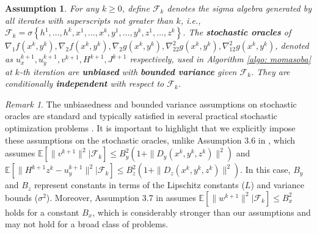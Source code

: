 \documentclass[10pt]{article}
\newtheorem{assumption}{Assumption}
\theoremstyle{remark}
\newtheorem*{remark}{Remark}
\def\setF{\mathscr{F}} %
\newcommand{\E}{\mathbb{E}}
\newcommand{\norm}[1]{\left\|#1\right\|}
\begin{document}
\begin{assumption}\label{aspt: stochastic_grad}
    For any $k\geq 0$, define $\setF_k$ denotes the sigma algebra generated by all iterates with superscripts not greater than $k$, i.e., $\setF_k = \sigma\left\{h^1, \dots, h^k, x^1,\dots, x^k, y^1, \dots, y^k, z^1,\dots,z^k\right\}$.
    The \textbf{stochastic oracles} of $\nabla_1 f(x^k, y^k), \nabla_2 f(x^k, y^k), \nabla_2 g(x^k, y^k), \nabla_{22}^2 g(x^k, y^k), \nabla_{12}^2 g(x^k, y^k)$, denoted as $u_x^{k+1}, u_y^{k+1}, v^{k+1}, H^{k+1}, J^{k+1}$ respectively, used in Algorithm \ref{algo: momasoba} at $k$-th iteration are \textbf{unbiased} with \textbf{bounded variance} given $\setF_k$. They are conditionally \textbf{independent} with respect to $\setF_k$.
\end{assumption}
\begin{remark}
    The unbiasedness and bounded variance assumptions on stochastic oracles are standard and typically satisfied in several practical stochastic optimization problems \cite{lan2020first}. It is important to highlight that we explicitly impose these assumptions on the stochastic oracles, unlike Assumption 3.6 in \cite{dagreou2022framework}, which assumes $\E[\|v^{k+1}\|^2|\setF_k] \leq B_y^2 (1+ \|D_y(x^k, y^k, z^k)\|^2)$ and $\E[\|H^{k+1}z^{k} - u_y^{k+1}\|^2|\setF_k] \leq B_z^2 (1+ \|D_z(x^k, y^k, z^k)\|^2)$. In this case, $B_y$ and $B_z$ represent constants in terms of the Lipschitz constants ($L$) and variance bounds ($\sigma^2$). Moreover, Assumption 3.7 in \cite{dagreou2022framework} assumes $\E[\|w^{k+1}\|^2|\setF_k] \leq B_x^2$ holds for a constant $B_x$, which is considerably stronger than our assumptions and may not hold for a broad class of problems.
\end{remark}
\end{document}
